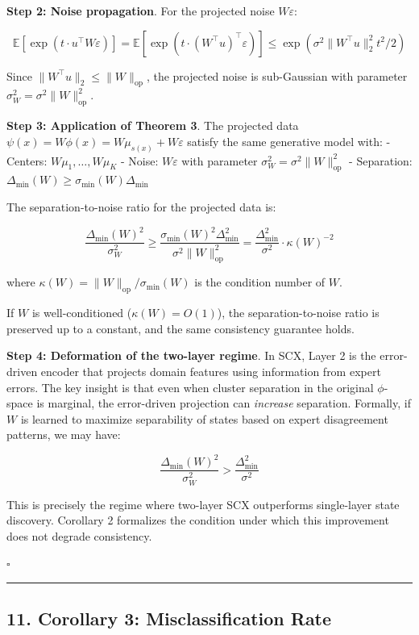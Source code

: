 \documentclass[
  12pt,
]{article}
\begin{document}
\textbf{Step 2: Noise propagation}. For the projected noise
\(W\varepsilon\):

\[\mathbb{E}[\exp(t \cdot u^\top W\varepsilon)] = \mathbb{E}[\exp(t \cdot (W^\top u)^\top \varepsilon)] \leq \exp(\sigma^2 \|W^\top u\|_2^2 t^2 / 2)\]

Since \(\|W^\top u\|_2 \leq \|W\|_{\text{op}}\), the projected noise is
sub-Gaussian with parameter
\(\sigma_W^2 = \sigma^2 \|W\|_{\text{op}}^2\).

\textbf{Step 3: Application of Theorem 3}. The projected data
\(\psi(x) = W\phi(x) = W\mu_{s(x)} + W\varepsilon\) satisfy the same
generative model with: - Centers: \(W\mu_1, \dots, W\mu_K\) - Noise:
\(W\varepsilon\) with parameter
\(\sigma_W^2 = \sigma^2 \|W\|_{\text{op}}^2\) - Separation:
\(\Delta_{\min}(W) \geq \sigma_{\min}(W) \Delta_{\min}\)

The separation-to-noise ratio for the projected data is:

\[\frac{\Delta_{\min}(W)^2}{\sigma_W^2} \geq \frac{\sigma_{\min}(W)^2 \Delta_{\min}^2}{\sigma^2 \|W\|_{\text{op}}^2} = \frac{\Delta_{\min}^2}{\sigma^2} \cdot \kappa(W)^{-2}\]

where \(\kappa(W) = \|W\|_{\text{op}} / \sigma_{\min}(W)\) is the
condition number of \(W\).

If \(W\) is well-conditioned (\(\kappa(W) = O(1)\)), the
separation-to-noise ratio is preserved up to a constant, and the same
consistency guarantee holds.

\textbf{Step 4: Deformation of the two-layer regime}. In SCX, Layer 2 is
the error-driven encoder that projects domain features using information
from expert errors. The key insight is that even when cluster separation
in the original \(\phi\)-space is marginal, the error-driven projection
can \emph{increase} separation. Formally, if \(W\) is learned to
maximize separability of states based on expert disagreement patterns,
we may have:

\[\frac{\Delta_{\min}(W)^2}{\sigma_W^2} > \frac{\Delta_{\min}^2}{\sigma^2}\]

This is precisely the regime where two-layer SCX outperforms
single-layer state discovery. Corollary 2 formalizes the condition under
which this improvement does not degrade consistency.

\(\square\)

\begin{center}\rule{0.5\linewidth}{0.5pt}\end{center}

\subsection{11. Corollary 3: Misclassification
Rate}\label{corollary-3-misclassification-rate}
\end{document}
